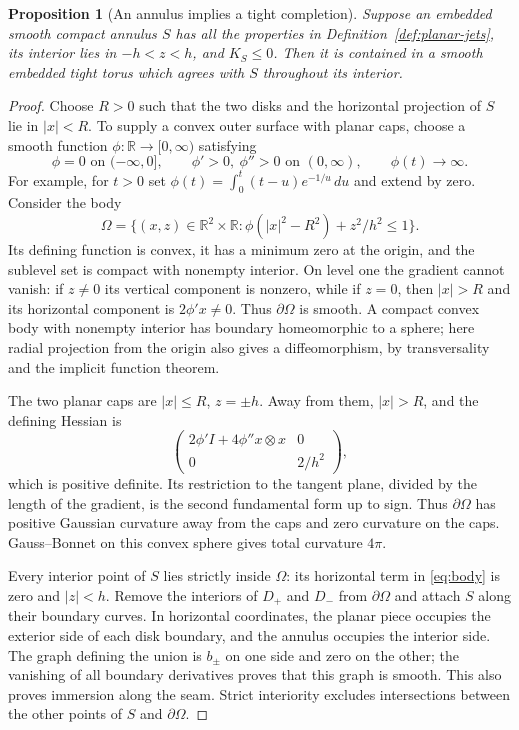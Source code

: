\documentclass[11pt]{amsart}
\newtheorem{proposition}[theorem]{Proposition}
\theoremstyle{definition}
\newcommand{\R}{\mathbb R}
\begin{document}
\begin{proposition}[An annulus implies a tight completion]
\label{prop:completion}
Suppose an embedded smooth compact annulus $S$ has all the properties
in Definition~\ref{def:planar-jets}, its interior lies in $-h<z<h$,
and $K_S\le0$. Then it is contained in a smooth embedded tight torus
which agrees with $S$ throughout its interior.
\end{proposition}
\begin{proof}
Choose $R>0$ such that the two disks and the horizontal projection
of $S$ lie in $|x|<R$. To supply a convex outer surface with planar
caps, choose a smooth function $\phi:\R\to[0,\infty)$ satisfying
\[
 \phi=0\text{ on }(-\infty,0],\qquad
 \phi'>0,\ \phi''>0\text{ on }(0,\infty),\qquad
 \phi(t)\longrightarrow\infty.
\]
For example, for $t>0$ set
$\phi(t)=\int_0^t(t-u)e^{-1/u}\,du$ and extend by zero.
Consider the body
\begin{equation}\label{eq:body}
 \Omega=\{(x,z)\in\R^2\times\R:
                 \phi(|x|^2-R^2)+z^2/h^2\le1\}.
\end{equation}
Its defining function is convex, it has a minimum zero at the origin,
and the sublevel set is compact with nonempty interior.
On level one the gradient cannot vanish: if $z\ne0$ its vertical
component is nonzero, while if $z=0$, then $|x|>R$ and its horizontal
component is $2\phi' x\ne0$.
Thus $\partial\Omega$ is smooth. A compact convex body with nonempty
interior has boundary homeomorphic to a sphere; here radial projection
from the origin also gives a diffeomorphism, by transversality and
the implicit function theorem.

The two planar caps are $|x|\le R$, $z=\pm h$.
Away from them, $|x|>R$, and the defining Hessian is
\[
 \begin{pmatrix}
  2\phi'I+4\phi''x\otimes x&0\\0&2/h^2
 \end{pmatrix},
\]
which is positive definite. Its restriction to the tangent plane,
divided by the length of the gradient, is the second fundamental
form up to sign. Thus $\partial\Omega$ has positive Gaussian curvature
away from the caps and zero curvature on the caps.
Gauss--Bonnet on this convex sphere gives total curvature $4\pi$.

Every interior point of $S$ lies strictly inside $\Omega$: its
horizontal term in \eqref{eq:body} is zero and $|z|<h$.
Remove the interiors of $D_+$ and $D_-$ from $\partial\Omega$
and attach $S$ along their boundary curves. In horizontal coordinates,
the planar piece occupies the exterior side of each disk boundary,
and the annulus occupies the interior side. The graph defining the
union is $b_\pm$ on one side and zero on the other; the vanishing
of all boundary derivatives proves that this graph is smooth.
This also proves immersion along the seam. Strict interiority
excludes intersections between the other points of $S$ and
$\partial\Omega$.


\end{proof}
\end{document}
